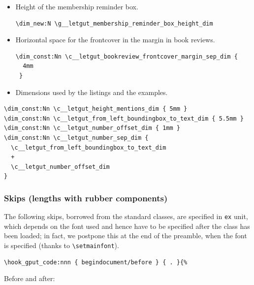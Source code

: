 \documentclass{letgut}
\begin{document}
\begin{itemize}
\begin{itemize}
\begin{lstlisting}
\end{lstlisting}
\item Height of the “L” (that of the text area plus 3cm).
\begin{lstlisting}
\dim_const:Nn \c__letgut_banner_height_dim  {
  \c__letgut_textheight_dim
  +
  3cm
}
\end{lstlisting}
\end{itemize}
\item Height of the membership reminder box.
\begin{lstlisting}
\dim_new:N \g__letgut_membership_reminder_box_height_dim
\end{lstlisting}
\item Horizontal space for the frontcover in the margin in book reviews.
\begin{lstlisting}
\dim_const:Nn \c__letgut_bookreview_frontcover_margin_sep_dim {
  4mm
 }
\end{lstlisting}
\item Dimensions used by the listings and the examples.
\end{itemize}
\begin{lstlisting}
\dim_const:Nn \c__letgut_height_mentions_dim { 5mm }
\dim_const:Nn \c__letgut_from_left_boundingbox_to_text_dim { 5.5mm }
\dim_const:Nn \c__letgut_number_offset_dim { 1mm }
\dim_const:Nn \c__letgut_number_sep_dim {
  \c__letgut_from_left_boundingbox_to_text_dim
  +
  \c__letgut_number_offset_dim
}
\end{lstlisting}
\subsubsection{Skips (lengths with rubber components)}
\label{ImplementationDeclarationsSkipslengthswithrubbercomponents-a4ag55h0jlj0}
The following skips, borrowed from the standard classes, are specified in
\lstinline+ex+ unit, which depends on the font used and hence have to be specified
after the class has been loaded; in fact, we postpone this at the end of the
preamble, when the font is specified (thanks to \lstinline+\setmainfont+).

\begin{lstlisting}
\hook_gput_code:nnn { begindocument/before } { . }{%
\end{lstlisting}

Before and after:
\end{document}
